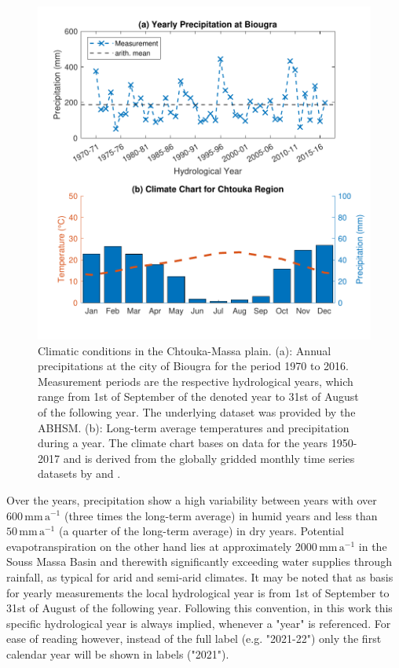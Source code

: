 \begin{figure}[p]
    \centering
    \includegraphics[width=1.0\textwidth]{./img/Fig-PrecNClimateChtouka.pdf}
    \caption{Climatic conditions in the Chtouka-Massa plain. (a): Annual precipitations at the city of Biougra for the period 1970 to 2016. Measurement periods are the respective hydrological years, which range from 1st of September of the denoted year to 31st of August of the following year. The underlying dataset was provided by the ABHSM. (b): Long-term average temperatures and precipitation during a year. The climate chart bases on data for the years 1950-2017 and is derived from the globally gridded monthly time series datasets by \textcite{Matsuura.2018T} and \textcite{Matsuura.2018P}.}
    \label{Fig-ClimateChart}
\end{figure}

Over the years, precipitation show a high variability between years with over $600 \, \textrm{mm} \, \textrm{a}^{-1}$ (three times the long-term average) in humid years and less than $50 \, \textrm{mm} \, \textrm{a}^{-1}$ (a quarter of the long-term average) in dry years. 
Potential evapotranspiration on the other hand lies at approximately $2000 \, \textrm{mm} \, \textrm{a}^{-1}$ in the Souss Massa Basin \parencite{Choukr.2017} and therewith significantly exceeding water supplies through rainfall, as typical for arid and semi-arid climates. 
It may be noted that as basis for yearly measurements the local hydrological year is from 1st of September to 31st of August of the following year. 
Following this convention, in this work this specific hydrological year is always implied, whenever a "year" is referenced. 
For ease of reading however, instead of the full label (e.g. "2021-22") only the first calendar year will be shown in labels ("2021").



